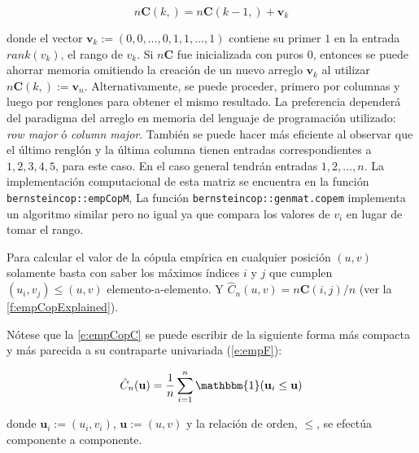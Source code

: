 \begin{equation}
	n\mathbf{C}(k,   ) =
	n\mathbf{C}(k-1, ) + \mathbf{v}_k
	\label{e:empCopRR}
\end{equation}

\noindent
donde el vector $\mathbf{v}_k := (0,0,\ldots,0,1,1,\ldots,1)$ contiene su primer $1$ en la entrada $rank(v_k)$, el rango de $v_k$.
Si $n \mathbf{C}$ fue inicializada con puros $0$, entonces se puede ahorrar memoria omitiendo la creaci\'on de un nuevo arreglo $\mathbf{v}_k$ al utilizar $n \mathbf{C}(k, ) := \mathbf{v}_n$.
Alternativamente, se puede proceder, primero por columnas y luego por renglones para obtener el mismo resultado.
La preferencia depender\'a del paradigma del arreglo en memoria del lenguaje de programaci\'on utilizado: \textit{row major} \'o \textit{column major}.
Tambi\'en se puede hacer m\'as eficiente al observar que el \'ultimo rengl\'on y la \'ultima columna tienen entradas correspondientes a $1,2,3,4,5$, para este caso. En el caso general tendr\'an entradas $1,2,\ldots,n$.
La implementaci\'on computacional de esta matriz se encuentra en la funci\'on \verb|bernsteincop::empCopM|, La funci\'on \verb|bernsteincop::genmat.copem| implementa un algoritmo similar pero no igual ya que compara los valores de $v_i$ en lugar de tomar el rango.

Para calcular el valor de la c\'opula emp\'irica en cualquier posici\'on $(u,v)$ solamente basta con saber los m\'aximos \'indices $i$ y $j$ que cumplen $(u_i,v_j) \le (u,v)$ elemento-a-elemento. Y $ \hat{C}_n(u,v) = n\mathbf{C}(i,j) / n$ (ver la \autoref{f:empCopExplained}).

N\'otese que la \autoref{e:empCopC} se puede escribir de la siguiente forma m\'as compacta y m\'as parecida a su contraparte univariada (\autoref{e:empF}):

\begin{equation}
	\hat{C}_{n}(\mathbf{u}) =
	\frac{1}{n} \sum_{i = 1}^{n}
	\mathbbm{1} (\mathbf{u}_{i} \leq \mathbf{u})
	\label{e:empCopV} %
\end{equation}

\noindent
donde $\mathbf{u}_i := (u_i, v_i)$, $\mathbf{u}:=(u,v)$ y la relaci\'on de orden, $\le$, se efect\'ua componente a componente.



